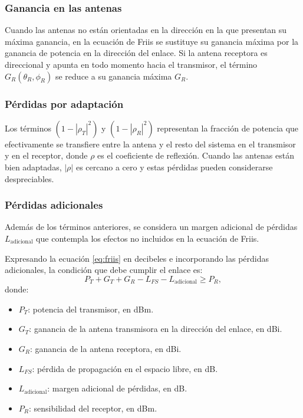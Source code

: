 \documentclass[12pt,a4paper]{article}
\begin{document}
\subsubsection{Ganancia en las antenas}

Cuando las antenas no están orientadas en la dirección en la que presentan su máxima ganancia, en la ecuación de Friis se sustituye su ganancia máxima por la ganancia de potencia en la dirección del enlace. Si la antena receptora es direccional y apunta en todo momento hacia el transmisor, el término $G_R(\theta_R,\phi_R)$ se reduce a su ganancia máxima $G_R$.

\subsubsection{Pérdidas por adaptación}

Los términos $\left(1-|\rho_T|^{2}\right)$ y $\left(1-|\rho_R|^{2}\right)$ representan la fracción de potencia que efectivamente se transfiere entre la antena y el resto del sistema en el transmisor y en el receptor, donde $\rho$ es el coeficiente de reflexión. Cuando las antenas están bien adaptadas, $|\rho|$ es cercano a cero y estas pérdidas pueden considerarse despreciables.

\subsubsection{Pérdidas adicionales}

Además de los términos anteriores, se considera un margen adicional de pérdidas $L_{\text{adicional}}$ que contempla los efectos no incluidos en la ecuación de Friis.

Expresando la ecuación \eqref{eq:friis} en decibeles e incorporando las pérdidas adicionales, la condición que debe cumplir el enlace es:
\begin{equation}
  P_T + G_T + G_R - L_{FS} - L_{\text{adicional}} \geq P_R,
  \label{eq:friis-db}
\end{equation}
donde:
\begin{itemize}
\item $P_T$: potencia del transmisor, en dBm.
\item $G_T$: ganancia de la antena transmisora en la dirección del enlace, en dBi.
\item $G_R$: ganancia de la antena receptora, en dBi.
\item $L_{FS}$: pérdida de propagación en el espacio libre, en dB.
\item $L_{\text{adicional}}$: margen adicional de pérdidas, en dB.
\item $P_R$: sensibilidad del receptor, en dBm.
\end{itemize}
\end{document}
